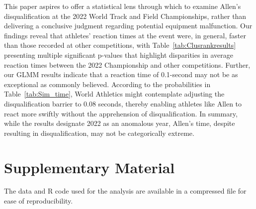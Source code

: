 \documentclass[12pt, letterpaper]{article}
\begin{document}
This paper aspires to offer a statistical lens through which to examine Allen's
disqualification at the 2022 World Track and Field Championships, rather than
delivering a conclusive judgment regarding potential equipment malfunction. Our
findings reveal that athletes' reaction times at the event were, in general,
faster than those recorded at other competitions, with
Table~\ref{tab:Clusrankresults} presenting multiple significant p-values that
highlight disparities in average reaction times between the 2022 Championship
and other competitions. Further, our GLMM results indicate that a reaction time
of 0.1-second may not be as exceptional as commonly believed. According to the
probabilities in Table~\ref{tab:Sim_time}, World Athletics might contemplate
adjusting the disqualification barrier to 0.08 seconds, thereby enabling athletes
like Allen to react more swiftly without the apprehension of
disqualification. In summary, while the results designate 2022 as an anomalous
year, Allen's time, despite resulting in disqualification, may not be
categorically extreme.


\section*{Supplementary Material}
The data and R code used for the analysis are available in a compressed file for
ease of reproducibility.



\end{document}
